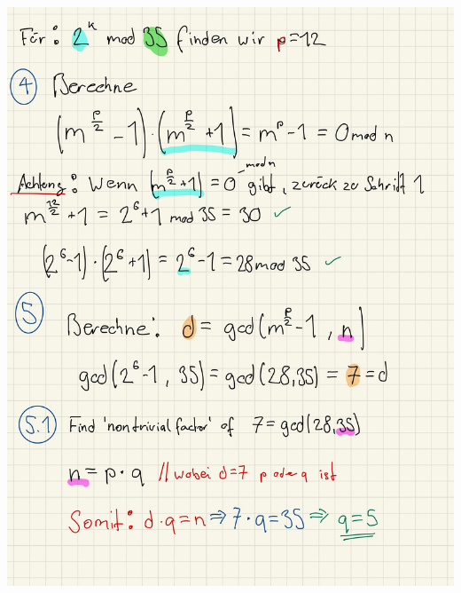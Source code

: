 \documentclass[11pt]{article}
\begin{document}
\begin{center}
	\includegraphics[scale=0.97]{img/shor2.jpg}\\
\end{center}



    
    
    
\end{document}
